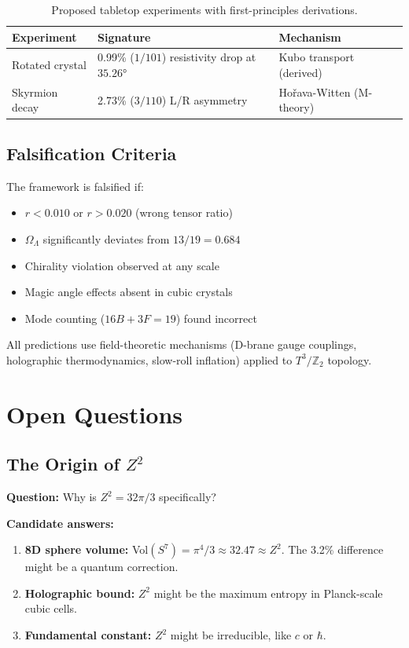 \documentclass[12pt,a4paper]{article}
\newcommand{\Ztwo}{\mathbb{Z}_2}
\newcommand{\Tthree}{T^3}
\newcommand{\OmegaL}{\Omega_\Lambda}
\newcommand{\Zsq}{Z^2}
\begin{document}
\begin{table}[H]
\centering
\begin{tabular}{lll}
\toprule
\textbf{Experiment} & \textbf{Signature} & \textbf{Mechanism} \\
\midrule
Rotated crystal & 0.99\% ($1/101$) resistivity drop at $35.26°$ & Kubo transport (derived) \\
Skyrmion decay & 2.73\% ($3/110$) L/R asymmetry & Hořava-Witten (M-theory) \\
\bottomrule
\end{tabular}
\caption{Proposed tabletop experiments with first-principles derivations.}
\end{table}

\subsection{Falsification Criteria}

The framework is falsified if:
\begin{itemize}
    \item $r < 0.010$ or $r > 0.020$ (wrong tensor ratio)
    \item $\OmegaL$ significantly deviates from $13/19 = 0.684$
    \item Chirality violation observed at any scale
    \item Magic angle effects absent in cubic crystals
    \item Mode counting ($16B + 3F = 19$) found incorrect
\end{itemize}

All predictions use field-theoretic mechanisms (D-brane gauge couplings, holographic thermodynamics, slow-roll inflation) applied to $\Tthree/\Ztwo$ topology.

\section{Open Questions}
\label{sec:open}

\subsection{The Origin of $\Zsq$}

\textbf{Question:} Why is $\Zsq = 32\pi/3$ specifically?

\textbf{Candidate answers:}
\begin{enumerate}
    \item \textbf{8D sphere volume:} Vol$(S^7) = \pi^4/3 \approx 32.47 \approx \Zsq$. The 3.2\% difference might be a quantum correction.
    \item \textbf{Holographic bound:} $\Zsq$ might be the maximum entropy in Planck-scale cubic cells.
    \item \textbf{Fundamental constant:} $\Zsq$ might be irreducible, like $c$ or $\hbar$.
\end{enumerate}
\end{document}

